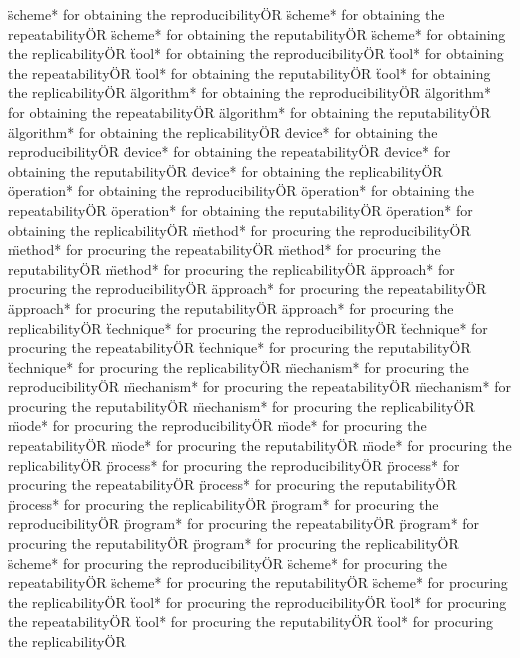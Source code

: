 \documentclass[
10pt, %
a4paper, %
oneside, %
headinclude,footinclude, %
BCOR5mm, %
]{scrartcl}
\begin{document}
\"scheme* for obtaining the reproducibility\" OR \"scheme* for obtaining the repeatability\" OR \"scheme* for obtaining the reputability\" OR \"scheme* for obtaining the replicability\" OR 
\"tool* for obtaining the reproducibility\" OR \"tool* for obtaining the repeatability\" OR \"tool* for obtaining the reputability\" OR \"tool* for obtaining the replicability\" OR 
\"algorithm* for obtaining the reproducibility\" OR \"algorithm* for obtaining the repeatability\" OR \"algorithm* for obtaining the reputability\" OR \"algorithm* for obtaining the replicability\" OR 
\"device* for obtaining the reproducibility\" OR \"device* for obtaining the repeatability\" OR \"device* for obtaining the reputability\" OR \"device* for obtaining the replicability\" OR 
\"operation* for obtaining the reproducibility\" OR \"operation* for obtaining the repeatability\" OR \"operation* for obtaining the reputability\" OR \"operation* for obtaining the replicability\" OR 
\"method* for procuring the reproducibility\" OR \"method* for procuring the repeatability\" OR \"method* for procuring the reputability\" OR \"method* for procuring the replicability\" OR 
\"approach* for procuring the reproducibility\" OR \"approach* for procuring the repeatability\" OR \"approach* for procuring the reputability\" OR \"approach* for procuring the replicability\" OR 
\"technique* for procuring the reproducibility\" OR \"technique* for procuring the repeatability\" OR \"technique* for procuring the reputability\" OR \"technique* for procuring the replicability\" OR 
\"mechanism* for procuring the reproducibility\" OR \"mechanism* for procuring the repeatability\" OR \"mechanism* for procuring the reputability\" OR \"mechanism* for procuring the replicability\" OR 
\"mode* for procuring the reproducibility\" OR \"mode* for procuring the repeatability\" OR \"mode* for procuring the reputability\" OR \"mode* for procuring the replicability\" OR 
\"process* for procuring the reproducibility\" OR \"process* for procuring the repeatability\" OR \"process* for procuring the reputability\" OR \"process* for procuring the replicability\" OR 
\"program* for procuring the reproducibility\" OR \"program* for procuring the repeatability\" OR \"program* for procuring the reputability\" OR \"program* for procuring the replicability\" OR 
\"scheme* for procuring the reproducibility\" OR \"scheme* for procuring the repeatability\" OR \"scheme* for procuring the reputability\" OR \"scheme* for procuring the replicability\" OR 
\"tool* for procuring the reproducibility\" OR \"tool* for procuring the repeatability\" OR \"tool* for procuring the reputability\" OR \"tool* for procuring the replicability\" OR 
\end{document}
